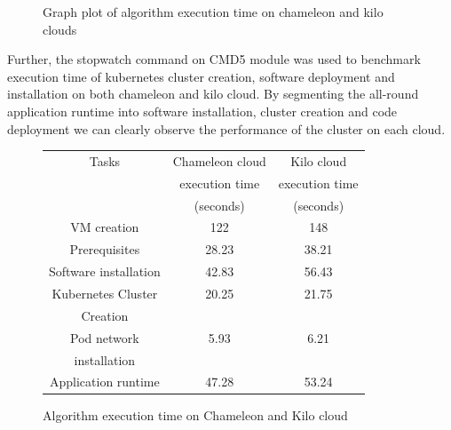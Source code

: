 \documentclass[9pt,twocolumn,twoside]{../../styles/osajnl}
\begin{document}
\begin{figure}[htbp]
\centering
{}
\caption{Graph plot of algorithm execution time on chameleon and kilo clouds}
\label{Graph plot of algorithm execution time on chameleon and kilo clouds}
\end{figure}

Further, the stopwatch command on CMD5 module was used to benchmark
execution time of kubernetes cluster creation, software deployment and
installation on both chameleon and kilo cloud. By segmenting the
all-round application runtime into software installation, cluster
creation and code deployment we can clearly observe the performance of
the cluster on each cloud.


\begin{figure}[ht]
\begin{center}
 \begin{tabular}{|c | c| c|} 
 \hline
 Tasks  & Chameleon cloud & Kilo cloud \\
 & execution time & execution time \\
 & (seconds) & (seconds) \\ [0.5ex] 
 \hline\hline
    
VM creation & 122 & 148 \\
\hline

Prerequisites & 28.23 & 38.21 \\
\hline

Software installation & 42.83  & 56.43 \\[1ex]
\hline

Kubernetes Cluster & 20.25 & 21.75 \\
Creation & & \\[1ex]

\hline
Pod network & 5.93 & 6.21 \\
installation & & \\[1ex]

\hline
Application runtime & 47.28 & 53.24\\[1ex]
\hline

\end{tabular}
\end{center}
  \caption{Algorithm execution time on Chameleon and Kilo cloud}
\end{figure}
\end{document}
